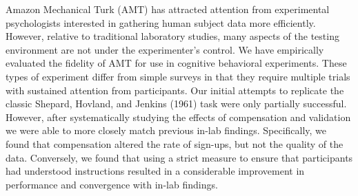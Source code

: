 \documentclass[10pt,letterpaper]{article}
\begin{document}
Amazon Mechanical Turk (AMT) has attracted attention from experimental
psychologists interested in gathering human subject data more efficiently.
However, relative to traditional laboratory studies, many aspects of the testing
environment are not under the experimenter's control. We have empirically
evaluated the fidelity of AMT for use in cognitive behavioral experiments. These
types of experiment differ from simple surveys in that they require multiple
trials with sustained attention from participants.  Our initial attempts to
replicate the classic Shepard, Hovland, and Jenkins (1961) task were only
partially successful. However, after systematically studying the effects of
compensation and validation we were able to more closely match previous in-lab
findings. Specifically, we found that compensation altered the rate of sign-ups,
but not the quality of the data. Conversely, we found that using a strict measure
to ensure that participants had understood instructions resulted in a
considerable improvement in performance and convergence with in-lab findings.
\nocite{Shepard:1961wo}



\setlength{\bibleftmargin}{.125in}
\setlength{\bibindent}{-\bibleftmargin}


\end{document}
